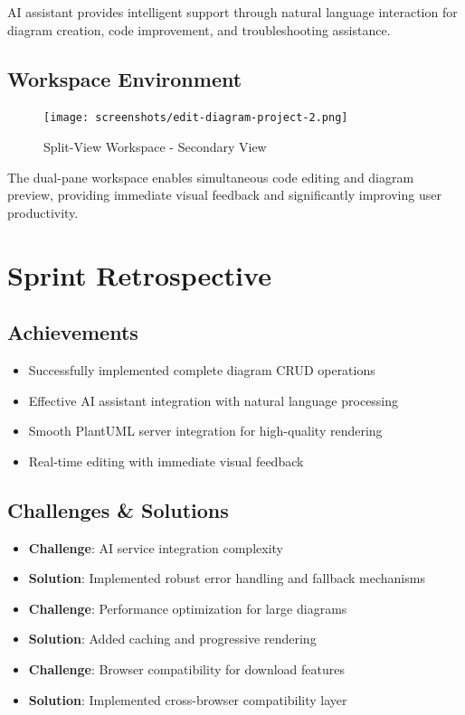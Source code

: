 AI assistant provides intelligent support through natural language interaction for diagram creation, code improvement, and troubleshooting assistance.

\subsection{Workspace Environment}


\begin{figure}[H]
\centering
\texttt{[image: screenshots/edit-diagram-project-2.png]}
\caption{Split-View Workspace - Secondary View}
\end{figure}

The dual-pane workspace enables simultaneous code editing and diagram preview, providing immediate visual feedback and significantly improving user productivity.

\section{Sprint Retrospective}

\subsection{Achievements}
\begin{itemize}
    \item Successfully implemented complete diagram CRUD operations
    \item Effective AI assistant integration with natural language processing
    \item Smooth PlantUML server integration for high-quality rendering
    \item Real-time editing with immediate visual feedback
\end{itemize}

\subsection{Challenges \& Solutions}
\begin{itemize}
    \item \textbf{Challenge}: AI service integration complexity
    \item \textbf{Solution}: Implemented robust error handling and fallback mechanisms
    \item \textbf{Challenge}: Performance optimization for large diagrams
    \item \textbf{Solution}: Added caching and progressive rendering
    \item \textbf{Challenge}: Browser compatibility for download features
    \item \textbf{Solution}: Implemented cross-browser compatibility layer
\end{itemize}



